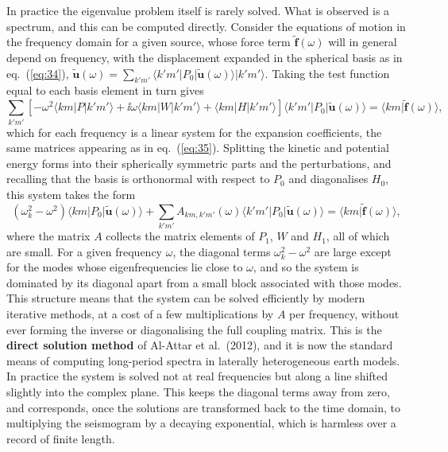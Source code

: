 In practice the eigenvalue problem itself is rarely solved. What is observed is a spectrum, and this can be computed directly. 
Consider the equations of motion in the frequency domain for a given source, whose force term $\tilde{\mathbf{f}}(\omega)$ will in general 
depend on frequency, with the displacement expanded in the spherical basis as in eq.~(\ref{eq:34}), 
$\tilde{\mathbf{u}}(\omega)=\sum_{k'm'}\langle k'm'|P_{0}|\tilde{\mathbf{u}}(\omega)\rangle|k'm'\rangle$. Taking the test function equal to each basis element in turn gives
\begin{equation}\label{eq:36}
\sum_{k'm'}\left[-\omega^{2}\langle km|P|k'm'\rangle+\ii\omega\langle km|W|k'm'\rangle+\langle km|H|k'm'\rangle\right]
\langle k'm'|P_{0}|\tilde{\mathbf{u}}(\omega)\rangle=\langle km|\tilde{\mathbf{f}}(\omega)\rangle,
\end{equation}
which for each frequency is a linear system for the expansion coefficients, the same matrices appearing as in eq.~(\ref{eq:35}). 
Splitting the kinetic and potential energy forms into their spherically symmetric parts and the perturbations, and recalling that the 
basis is orthonormal with respect to $P_{0}$ and diagonalises $H_{0}$, this system takes the form
\begin{equation}\label{eq:37}
(\omega_{k}^{2}-\omega^{2})\langle km|P_{0}|\tilde{\mathbf{u}}(\omega)\rangle+\sum_{k'm'}A_{km,k'm'}(\omega)\langle k'm'|P_{0}|\tilde{\mathbf{u}}(\omega)\rangle
=\langle km|\tilde{\mathbf{f}}(\omega)\rangle,
\end{equation}
where the matrix $A$ collects the matrix elements of $P_{1}$, $W$ and $H_{1}$, all of which are small. For a given frequency 
$\omega$, the diagonal terms $\omega_{k}^{2}-\omega^{2}$ are large except for the modes whose eigenfrequencies lie close to 
$\omega$, and so the system is dominated by its diagonal apart from a small block associated with those modes. This structure 
means that the system can be solved efficiently by modern iterative methods, at a cost of a few multiplications by $A$ 
per frequency, without ever forming the inverse or diagonalising the full coupling matrix. This is the 
\textbf{direct solution method} of Al-Attar et al.\ (2012), and it is now the standard means of computing 
long-period spectra in laterally heterogeneous earth models. In practice the system is solved not at real frequencies but along 
a line shifted slightly into the complex plane. This keeps the diagonal terms away from zero, and corresponds, once the solutions are 
transformed back to the time domain, to multiplying the seismogram by a decaying exponential, which is harmless over a record of finite length.

